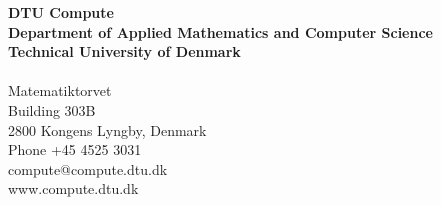 \thispagestyle{empty} %
\frieze
\vspace*{\fill}
\noindent
\sffamily
\small
\textbf{DTU Compute}\\
\textbf{Department of Applied Mathematics and Computer Science}\\
\textbf{Technical University of Denmark}\\
\\
Matematiktorvet\\
Building 303B\\
2800 Kongens Lyngby, Denmark\\
Phone +45 4525 3031\\
compute@compute.dtu.dk\\
www.compute.dtu.dk\\
\normalsize
\normalfont
\vspace*{2.5cm}
